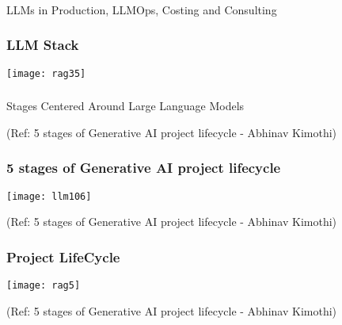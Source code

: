 \begin{frame}[fragile]\frametitle{}
\begin{center}
{\Large LLMs in Production, LLMOps, Costing and Consulting}
\end{center}
\end{frame}

\begin{frame}[fragile]\frametitle{LLM Stack}
		\begin{center}
		\texttt{[image: rag35]}
		\end{center}

\end{frame}


\begin{frame}[fragile]\frametitle{}
\begin{center}
{\Large  Stages Centered Around Large Language Models}

{\tiny (Ref: 5 stages of Generative AI project lifecycle - Abhinav Kimothi)}

\end{center}
\end{frame}

\begin{frame}[fragile]\frametitle{5 stages of Generative AI project lifecycle}


		\begin{center}
		\texttt{[image: llm106]}
		\end{center}

{\tiny (Ref: 5 stages of Generative AI project lifecycle - Abhinav  Kimothi)}

\end{frame}


\begin{frame}[fragile]\frametitle{Project LifeCycle}


		\begin{center}
		\texttt{[image: rag5]}
		\end{center}

{\tiny (Ref: 5 stages of Generative AI project lifecycle - Abhinav  Kimothi)}

\end{frame}


